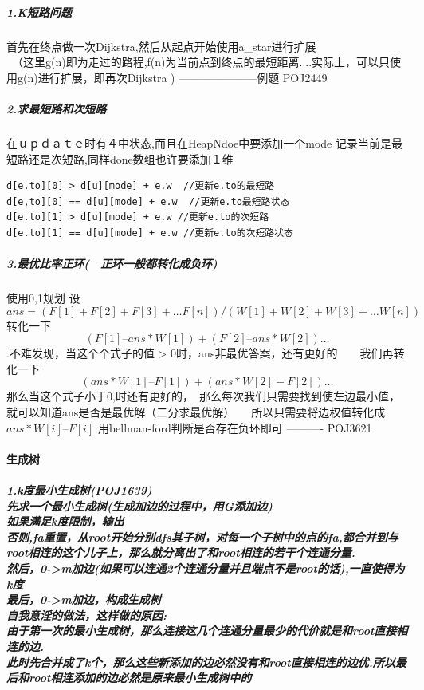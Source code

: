 \documentclass{article}
\begin{document}
\subparagraph{1.K短路问题\\}
首先在终点做一次Dijkstra,然后从起点开始使用a\_star进行扩展\\　（这里g(n)即为走过的路程,f(n)为当前点到终点的最短距离....实际上，可以只使用g(n)进行扩展，即再次Dijkstra )    ---------------------例题 POJ2449  
\subparagraph{2.求最短路和次短路\\}
在ｕｐｄａｔｅ时有４中状态,而且在HeapNdoe中要添加一个mode 记录当前是最短路还是次短路,同样done数组也许要添加１维 
\begin{lstlisting}
d[e.to][0] > d[u][mode] + e.w  //更新e.to的最短路						
d[e,to][0] == d[u][mode] + e.w  //更新e.to最短路状态							
d[e.to][1] > d[u][mode] + e.w //更新e.to的次短路							
d[e.to][1] == d[u][mode] + e.w //更新e.to的次短路状态
\end{lstlisting}

\subparagraph{3.最优比率正环(　正环一般都转化成负环)\\}
使用0,1规划  设$$ans =  (F[1] + F[2] + F[3] + … F[n] ) / ( W[1] + W[2] + W[3] + … W[n] )$$
转化一下$$( F[1] – ans*W[1]  ) + ( F[2] – ans*W[2]  ) …$$.不难发现，当这个个式子的值 > 0时，ans非最优答案，还有更好的　　我们再转化一下$$(  ans*W[1] – F[1] ) +  ( ans*W[2] - F[2] ) … $$
那么当这个式子小于0,时还有更好的，　那么每次我们只需要找到使左边最小值，就可以知道ans是否是最优解（二分求最优解）　　所以只需要将边权值转化成 $ans*W[i] – F[i]$ 用bellman-ford判断是否存在负环即可  ---------- POJ3621 
\paragraph{生成树}
\subparagraph{1.k度最小生成树(POJ1639)\\
先求一个最小生成树(生成加边的过程中，用G添加边)\\
如果满足k度限制，输出\\
否则,fa重置，从root开始分别dfs其子树，对每一个子树中的点的fa,都合并到与root相连的这个儿子上，那么就分离出了和root相连的若干个连通分量.\\
然后，0->m加边(如果可以连通2个连通分量并且端点不是root的话),一直使得为k度\\
最后，0->m加边，构成生成树 \\
自我意淫的做法，这样做的原因: \\ 由于第一次的最小生成树，那么连接这几个连通分量最少的代价就是和root直接相连的边.\\ 此时先合并成了k个，那么这些新添加的边必然没有和root直接相连的边优.所以最后和root相连添加的边必然是原来最小生成树中的}
\end{document}
